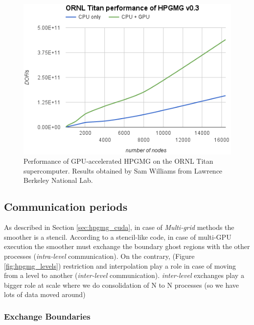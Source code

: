\documentclass[conference]{IEEEtran}
\begin{document}
\begin{figure}[h]
\includegraphics[scale=0.7]{hpgmg_ornl_titan_perf_cuda.png}
\caption{Performance of GPU-accelerated HPGMG on the ORNL Titan supercomputer. Results obtained by Sam Williams from Lawrence Berkeley National Lab.}
\label{fig:hpgmg_ornl_bench}
\end{figure}


\subsection{Communication periods}\label{sec:hpgmg_cuda_communications}

As described in Section \ref{sec:hpgmg_cuda}, in case of \emph{Multi-grid} methods the smoother is a stencil. According to a stencil-like code, in case of multi-GPU execution the smoother must exchange the boundary ghost regions with the other processes (\emph{intra-level} communication). On the contrary, (Figure \ref{fig:hpgmg_levels}) restriction and interpolation play a role in case of moving from a level to another (\emph{inter-level} communication).
\emph{inter-level} exchanges play a bigger role at scale where we do consolidation of N to N processes (so we have lots of data moved around)

\subsubsection{Exchange Boundaries}
\end{document}
